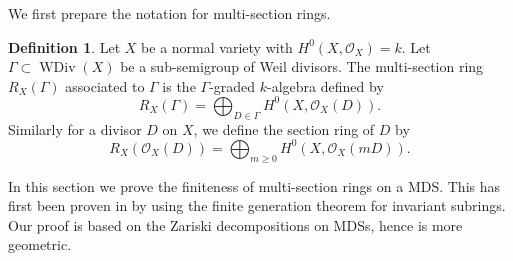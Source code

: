 \documentclass[12pt,twoside]{amsart}
\theoremstyle{definition}
\newtheorem{defi}[theo]{Definition}
\newcommand\WDivi{\mathop{\mathrm{WDiv}}\nolimits}
\newcommand\OO{\mathcal{O}}
\begin{document}
We first prepare the notation for multi-section rings.

\begin{defi}\label{multi-section ring}
Let $X$ be a normal variety with $H^0(X,\OO_{X})=k$.
Let $\Gamma\subset\WDivi{(X)}$ be a sub-semigroup of Weil divisors. The
multi-section ring $R_X(\Gamma)$ associated to $\Gamma$ is
the $\Gamma$-graded $k$-algebra defined by
\begin{equation*}
R_X(\Gamma)=\bigoplus_{D\in\Gamma}H^0(X,\mathcal{O}_X(D)).
\end{equation*}
Similarly for a divisor $D$ on $X$, we define the section ring of $D$ by
\begin{equation*}
R_{X}(\OO_X(D))=\bigoplus_{m\ge 0}H^0(X,\mathcal{O}_X(mD)).
\end{equation*}
\end{defi}

In this section we prove the finiteness of multi-section rings on a MDS.
This has first been proven in \cite[Theorem 1.2]{b} by using the finite generation theorem for
invariant subrings. Our proof is based on the Zariski decompositions on MDSs, hence
is more geometric.
\end{document}
